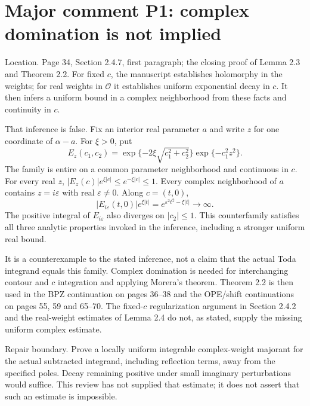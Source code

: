 \documentclass[10pt]{article}
\begin{document}
\section*{Major comment P1: complex domination is not implied}
Location. Page 34, Section 2.4.7, first paragraph; the closing proof of Lemma 2.3 and Theorem 2.2. For fixed \(c\), the manuscript establishes holomorphy in the weights; for real weights in \(\mathcal O\) it establishes uniform exponential decay in \(c\). It then infers a uniform bound in a complex neighborhood from these facts and continuity in \(c\).\par
That inference is false. Fix an interior real parameter \(a\) and write \(z\) for one coordinate of \(\alpha-a\). For \(\xi>0\), put \[E_z(c_1,c_2)=
 \exp\{-2\xi\sqrt{c_1^2+c_2^2}\}\exp\{-c_1^2z^2\}.\] The family is entire on a common parameter neighborhood and continuous in \(c\). For every real \(z\), \(|E_z(c)|e^{\xi|c|}\leq e^{-\xi|c|}\leq1\). Every complex neighborhood of \(a\) contains \(z=i\varepsilon\) with real \(\varepsilon\ne0\). Along \(c=(t,0)\), \[|E_{i\varepsilon}(t,0)|e^{\xi|t|}
 =e^{\varepsilon^2t^2-\xi|t|}\longrightarrow\infty.\] The positive integral of \(E_{i\varepsilon}\) also diverges on \(|c_2|\leq1\). This counterfamily satisfies all three analytic properties invoked in the inference, including a stronger uniform real bound.\par
It is a counterexample to the stated inference, not a claim that the actual Toda integrand equals this family. Complex domination is needed for interchanging contour and \(c\) integration and applying Morera’s theorem. Theorem 2.2 is then used in the BPZ continuation on pages 36–38 and the OPE/shift continuations on pages 55, 59 and 65–70. The fixed-\(c\) regularization argument in Section 2.4.2 and the real-weight estimates of Lemma 2.4 do not, as stated, supply the missing uniform complex estimate.\par
Repair boundary. Prove a locally uniform integrable complex-weight majorant for the actual subtracted integrand, including reflection terms, away from the specified poles. Decay remaining positive under small imaginary perturbations would suffice. This review has not supplied that estimate; it does not assert that such an estimate is impossible.\par
\end{document}
